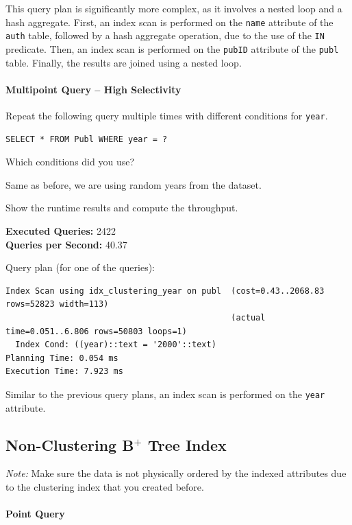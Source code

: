 \documentclass[11pt]{scrartcl}
\begin{document}
This query plan is significantly more complex, as it involves a nested loop and a hash aggregate.
First, an index scan is performed on the \texttt{name} attribute of the \texttt{auth} table, followed by a hash aggregate
operation, due to the use of the \texttt{IN} predicate.
Then, an index scan is performed on the \texttt{pubID} attribute of the \texttt{publ} table.
Finally, the results are joined using a nested loop.

\paragraph{Multipoint Query -- High Selectivity}

Repeat the following query multiple times with different conditions for \texttt{year}.

\begin{lstlisting}[style=dbtsql]
SELECT * FROM Publ WHERE year = ?
\end{lstlisting}

Which conditions did you use?

Same as before, we are using random years from the dataset.

Show the runtime results and compute the throughput.

\textbf{Executed Queries: } 2422\\
\textbf{Queries per Second: } 40.37

Query plan (for one of the queries):

{\small
\parskip0pt\begin{verbatim}
Index Scan using idx_clustering_year on publ  (cost=0.43..2068.83 rows=52823 width=113)
                                              (actual time=0.051..6.806 rows=50803 loops=1)
  Index Cond: ((year)::text = '2000'::text)
Planning Time: 0.054 ms
Execution Time: 7.923 ms
\end{verbatim}}
Similar to the previous query plans, an index scan is performed on the \texttt{year} attribute.

\subsection*{Non-Clustering B$^+$ Tree Index}

\emph{Note:} Make sure the data is not physically ordered by the indexed attributes due to the clustering index that you created before.

\paragraph{Point Query}
\end{document}

